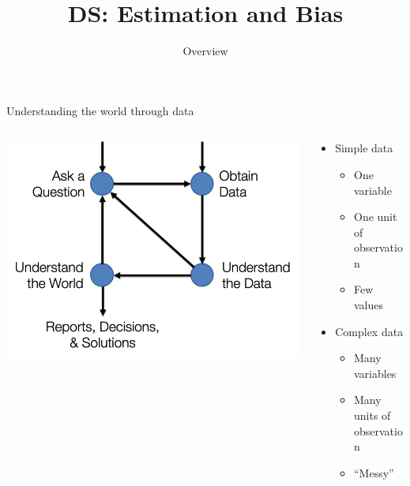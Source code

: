 \documentclass[aspectratio=169]{../latex_main/tntbeamer}  %
\title[Statistics]{DS: Estimation and Bias}
\subtitle{Overview}
\begin{document}
	
	\maketitle
    \begin{frame}{Understanding the world through data}
        \begin{columns}
        \begin{column}{.4\textwidth}

                \centering        
                \includegraphics[scale=.6]{Bild1}
        
        \end{column}
        
        \begin{column}{.4\textwidth}
            \begin{itemize}
                \item Simple data
                \begin{itemize}
                    \item One variable
                    \item One unit of observation
                    \item Few values
                \end{itemize}
            \end{itemize}
        
            \begin{itemize}
                \item Complex data
                \begin{itemize}
                    \item Many variables
                    \item Many units of observation
                    \item ``Messy''
                \end{itemize}
            \end{itemize}
        
        
        \end{column}
        
        
        \end{columns}
        
    \end{frame}
    
\end{document}
